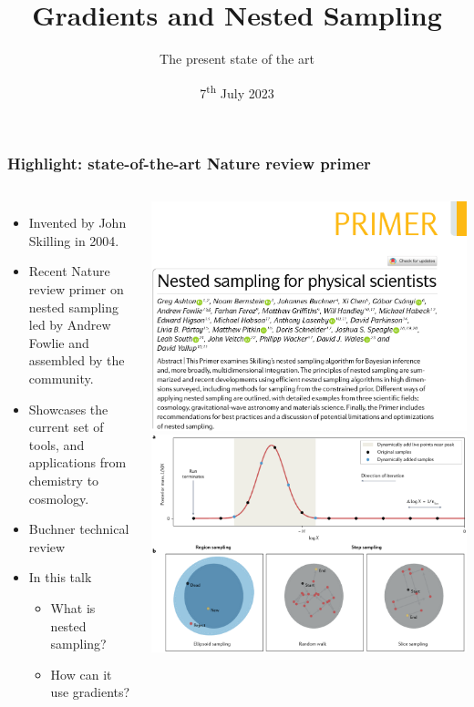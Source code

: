 \documentclass[aspectratio=169]{beamer}
\title{Gradients and Nested Sampling}
\subtitle{The present state of the art}
\date{7\textsuperscript{th} July 2023}
\begin{document}
\begin{frame}
    \titlepage
\end{frame}

\begin{frame}
    \frametitle{Highlight: state-of-the-art Nature review primer  }
    \begin{columns}
        \begin{itemize}
            \item Invented by John Skilling in 2004.
            \item Recent Nature review primer on nested sampling led by Andrew Fowlie and assembled by the community.
            \item Showcases the current set of tools, and applications from chemistry to cosmology.
            \item Buchner technical review 
            \item In this talk
                \begin{itemize}
                    \item What is nested sampling?
                    \item How can it use gradients?
                \end{itemize}
        \end{itemize}
        \includegraphics[width=\textwidth]{figures/nature1}
        \includegraphics[width=\textwidth]{figures/nature2}

\end{columns}
\end{frame}
\end{document}
